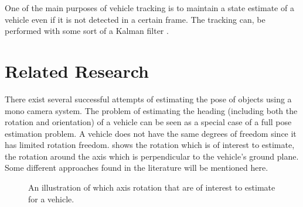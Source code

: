 One of the main purposes of vehicle tracking is to maintain a state estimate of a vehicle even if it is not detected in a certain frame.
The tracking can, \eg be performed with some sort of a Kalman filter \cite{Sivaraman:2013}.

\section{Related Research}
\label{sec:relatedresearch}
There exist several successful attempts of estimating the  pose of objects using a mono camera system.
The problem of estimating the heading (including both the rotation and orientation) of a vehicle can be seen as a special case of a full  pose estimation problem.
A vehicle does not have the same degrees of freedom since it has limited rotation freedom.
 shows the rotation which is of interest to estimate, \ie the rotation around the axis which is perpendicular to the vehicle's ground plane.
Some different approaches found in the literature will be mentioned here.

\begin{figure}[!ht]
	\centering
	\caption{\label{fig:vehiclerotation} An illustration of which axis rotation that are of interest to estimate for a vehicle.}
\end{figure}

